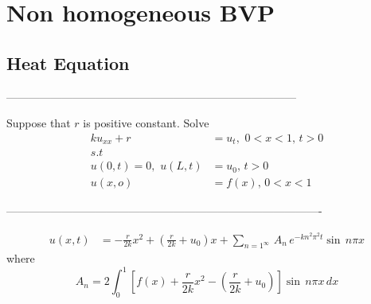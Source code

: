 \setcounter{chapter}{2}
\chapter{Non homogeneous BVP}
\section{Heat Equation}
\begin{center}------------------------------------------------------------------------------\end{center}
Suppose that $r$ is positive constant. Solve 
\begin{align*}
ku_{xx}+r&=u_t,\,\,0<x<1,\,t>0\\
s.t\,\,\,&\\
u(0,t)=0,\,\,u(L,t)&=u_0,\,t>0\\
u(x,o)&=f(x),\,0<x<1
\end{align*}
\begin{center}-------------------------------------------------------------------------------------\end{center}
\begin{align*}
u(x,t)&=-\frac{r}{2k}x^2+\left(\frac{r}{2k}+u_0\right)x+\sum_{n=1^\infty}\,A_n\,e^{-kn^2\pi^2t}\sin\,n\pi x
\end{align*}
where 
\begin{equation}
A_n=2\int_0^1\left[f(x)+\frac{r}{2k}x^2-\left(\frac{r}{2k}+u_0\right)\right]\sin\,n\pi x\,dx\label{an}
\end{equation}
